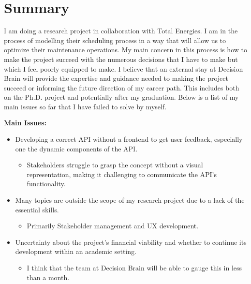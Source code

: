 \section*{Summary}
I am doing a research project in collaboration with Total Energies. I am in the process of modelling 
their scheduling process in a way that will allow us to optimize their maintenance operations. My main concern
in this process is how to make the project succeed with the numerous decisions that I have to make but 
which I feel poorly equipped to make. I believe that an external stay at Decision Brain will provide the 
expertise and guidance needed to making the project succeed or informing the future direction of my career path. 
This includes both on the Ph.D. project and potentially after my graduation. Below is a list of my main issues so far 
that I have failed to solve by myself. 

\textbf{Main Issues:}
\begin{itemize}
	\item Developing a correct API without a frontend to get user feedback, especially one the dynamic components of the API.
	\begin{itemize}
		\item Stakeholders struggle to grasp the concept without a visual representation, making it challenging to communicate the API's functionality.
	\end{itemize}
	\item Many topics are outside the scope of my research project due to a lack of the essential skills. 
	\begin{itemize}
		\item Primarily Stakeholder management and UX development.
	\end{itemize}
	\item Uncertainty about the project's financial viability and whether to continue its development within an academic setting.
	\begin{itemize}
		\item I think that the team at Decision Brain will be able to gauge this in less than a month.	
	\end{itemize}
\end{itemize}
